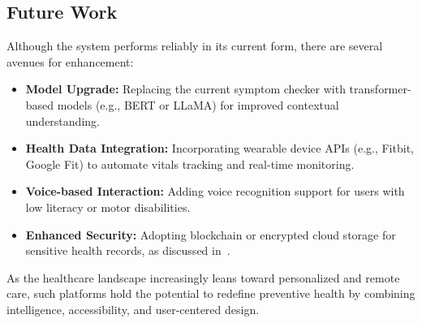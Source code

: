 \documentclass[conference]{IEEEtran}
\begin{document}
\subsection*{Future Work}

Although the system performs reliably in its current form, there are several avenues for enhancement:

\begin{itemize}
    \item \textbf{Model Upgrade:} Replacing the current symptom checker with transformer-based models (e.g., BERT or LLaMA) for improved contextual understanding.
    \item \textbf{Health Data Integration:} Incorporating wearable device APIs (e.g., Fitbit, Google Fit) to automate vitals tracking and real-time monitoring.
    \item \textbf{Voice-based Interaction:} Adding voice recognition support for users with low literacy or motor disabilities.
    \item \textbf{Enhanced Security:} Adopting blockchain or encrypted cloud storage for sensitive health records, as discussed in~\cite{nour2022secure}.
\end{itemize}

As the healthcare landscape increasingly leans toward personalized and remote care, such platforms hold the potential to redefine preventive health by combining intelligence, accessibility, and user-centered design.
\end{document}
